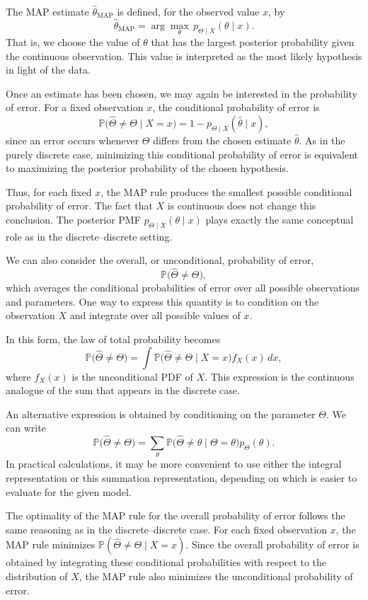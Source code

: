 The MAP estimate \(\hat{\theta}_{\text{MAP}}\) is defined, for the observed value \(x\), by
\[
\hat{\theta}_{\text{MAP}}
=
\arg\max_{\theta} \, p_{\Theta \mid X}(\theta \mid x).
\]
That is, we choose the value of \(\theta\) that has the largest posterior probability given the continuous observation.  
This value is interpreted as the most likely hypothesis in light of the data.  

Once an estimate has been chosen, we may again be interested in the probability of error.  
For a fixed observation \(x\), the conditional probability of error is
\[
\mathbb{P}\big(\hat{\Theta} \neq \Theta \mid X = x\big)
=
1 - p_{\Theta \mid X}(\hat{\theta} \mid x),
\]
since an error occurs whenever \(\Theta\) differs from the chosen estimate \(\hat{\theta}\).  
As in the purely discrete case, minimizing this conditional probability of error is equivalent to maximizing the posterior probability of the chosen hypothesis.  

Thus, for each fixed \(x\), the MAP rule produces the smallest possible conditional probability of error.  
The fact that \(X\) is continuous does not change this conclusion.  
The posterior PMF \(p_{\Theta \mid X}(\theta \mid x)\) plays exactly the same conceptual role as in the discrete–discrete setting.  

We can also consider the overall, or unconditional, probability of error,
\[
\mathbb{P}\big(\hat{\Theta} \neq \Theta\big),
\]
which averages the conditional probabilities of error over all possible observations and parameters.  
One way to express this quantity is to condition on the observation \(X\) and integrate over all possible values of \(x\).  

In this form, the law of total probability becomes
\[
\mathbb{P}\big(\hat{\Theta} \neq \Theta\big)
=
\int
\mathbb{P}\big(\hat{\Theta} \neq \Theta \mid X = x\big)
f_{X}(x)\,dx,
\]
where \(f_{X}(x)\) is the unconditional PDF of \(X\).  
This expression is the continuous analogue of the sum that appears in the discrete case.  

An alternative expression is obtained by conditioning on the parameter \(\Theta\).  
We can write
\[
\mathbb{P}\big(\hat{\Theta} \neq \Theta\big)
=
\sum_{\theta}
\mathbb{P}\big(\hat{\Theta} \neq \theta \mid \Theta = \theta\big)
p_{\Theta}(\theta).
\]
In practical calculations, it may be more convenient to use either the integral representation or this summation representation, depending on which is easier to evaluate for the given model.  

The optimality of the MAP rule for the overall probability of error follows the same reasoning as in the discrete–discrete case.  
For each fixed observation \(x\), the MAP rule minimizes \(\mathbb{P}(\hat{\Theta} \neq \Theta \mid X = x)\).  
Since the overall probability of error is obtained by integrating these conditional probabilities with respect to the distribution of \(X\), the MAP rule also minimizes the unconditional probability of error.  

